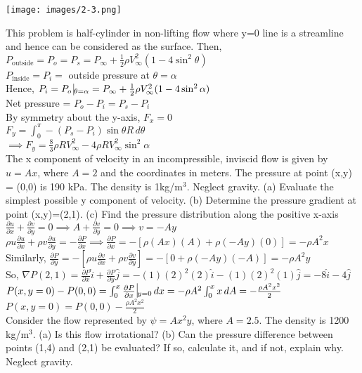 \documentclass[12pt, twocolumn, letterpaper]{article}
\begin{document}
\begin{center}
    \texttt{[image: images/2-3.png]}
\end{center}
This problem is half-cylinder in non-lifting flow where y=0 line is a streamline and hence can be considered as the surface. Then,\\
$P_\text{outside}=P_o=P_s=P_\infty+\frac{1}{2}\rho V_\infty^2(1-4\sin^2\theta)$\\
$P_\text{inside}=P_i=$ outside pressure at $\theta=\alpha$\\
Hence, $P_i=P_o\,\vline_{\theta=\alpha}=P_\infty+\frac{1}{2}\rho V_\infty^2(1-4\sin^2\alpha)$\\
Net pressure = $P_o-P_i=P_s-P_i$\\
By symmetry about the y-axis, $F_x=0$\\
$F_y=\int_0^\pi-\left(P_s-P_i\right)\sin\theta R\,d\theta$\\
$\implies F_y=\frac{8}{3}\rho R V_\infty^2-4\rho R V_\infty^2\sin^2\alpha$\\
\hline
The x component of velocity in an incompressible, inviscid flow is given by $u=Ax$, where $A=2$ and the coordinates in meters. The pressure at point (x,y) = (0,0) is 190 kPa. The density is 1kg/m$^3$. Neglect gravity. (a) Evaluate the simplest possible y component of velocity. (b) Determine the pressure gradient at point (x,y)=(2,1). (c) Find the pressure distribution along the positive x-axis\\
$\frac{\partial u}{\partial x}+\frac{\partial v}{\partial y}=0\implies A+\frac{\partial v}{\partial y}=0 \implies v=-Ay$\\
$\rho u\frac{\partial u}{\partial x}+\rho v\frac{\partial u}{\partial y}=-\frac{\partial P}{\partial x}\implies\frac{\partial P}{\partial x}=-\left[\rho(Ax)(A)+\rho(-Ay)(0)\right]=-\rho A^2x$\\
Similarly, $\frac{\partial P}{\partial y}=-\left[\rho u\frac{\partial v}{\partial x}+\rho v\frac{\partial v}{\partial y}\right]=-\left[0+\rho(-Ay)(-A)\right]=-\rho A^2y$\\
So, $\nabla P (2,1) = \frac{\partial P}{\partial x}\hat{i}+\frac{\partial P}{\partial y}\hat{j}=-(1)(2)^2(2)\hat{i}-(1)(2)^2(1)\hat{j}=-8\hat{i}-4\hat{j}$\\
$P(x, y=0)-P(0,0)=\int_0^x\frac{\partial P}{\partial x}\,\vline_{y=0}\,dx=-\rho A^2\int_0^x x\,dA=-\frac{\rho A^2x^2}{2}$\\
$P(x,y=0)=P(0,0)-\frac{\rho A^2x^2}{2}$\\
\hline
Consider the flow represented by $\psi=Ax^2y$, where $A=2.5$. The density is 1200 kg/m$^3$. (a) Is this flow irrotational? (b) Can the pressure difference between points (1,4) and (2,1) be evaluated? If so, calculate it, and if not, explain why. Neglect gravity.\\
\end{document}
